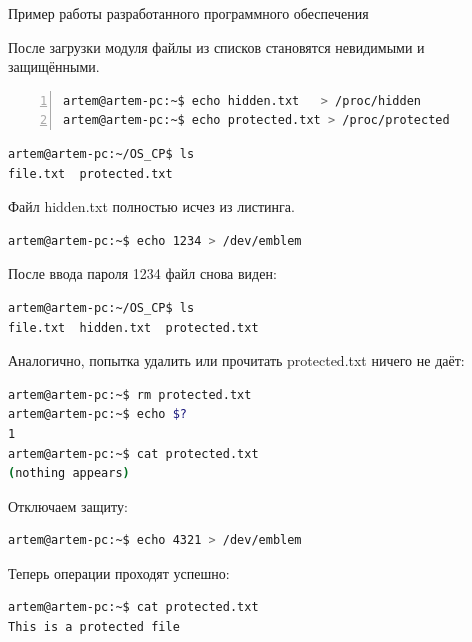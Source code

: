 Пример работы разработанного программного обеспечения

После загрузки модуля файлы из списков становятся невидимыми и защищёнными.

\begin{lstlisting}[language=bash, frame=single, numbers=left, caption={Добавление файлов в списки}]
artem@artem-pc:~$ echo hidden.txt   > /proc/hidden
artem@artem-pc:~$ echo protected.txt > /proc/protected
\end{lstlisting}

\begin{lstlisting}[language=bash, frame=single, caption={Содержимое директории после загрузки модуля}]
artem@artem-pc:~/OS_CP$ ls
file.txt  protected.txt
\end{lstlisting}

Файл hidden.txt полностью исчез из листинга.

\begin{lstlisting}[language=bash, caption={Отключение режима скрытия}]
artem@artem-pc:~$ echo 1234 > /dev/emblem
\end{lstlisting}

После ввода пароля 1234 файл снова виден:

\begin{lstlisting}[language=bash, caption={Файлы снова видны}]
artem@artem-pc:~/OS_CP$ ls
file.txt  hidden.txt  protected.txt
\end{lstlisting}

Аналогично, попытка удалить или прочитать protected.txt ничего не даёт:

\begin{lstlisting}[language=bash, caption={Защита от удаления и чтения работает}]
artem@artem-pc:~$ rm protected.txt
artem@artem-pc:~$ echo $?
1
artem@artem-pc:~$ cat protected.txt
(nothing appears)
\end{lstlisting}

Отключаем защиту:

\begin{lstlisting}[language=bash, caption={Отключение режима защиты}]
artem@artem-pc:~$ echo 4321 > /dev/emblem
\end{lstlisting}

Теперь операции проходят успешно:

\begin{lstlisting}[language=bash, caption={Файл снова доступен}]
artem@artem-pc:~$ cat protected.txt
This is a protected file
\end{lstlisting}